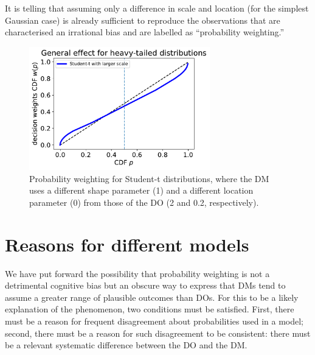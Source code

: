 \documentclass[a4paper, 12pt]{article}
\newcommand{\flabel}[1]{\label{fig:#1}}
\newcommand{\seclabel}[1]{\label{sec:#1}}
\newcommand{\ND}{\mathcal{N}} %
\begin{document}
It is telling that assuming only a difference in scale and location (for the simplest Gaussian case) is already sufficient to reproduce the observations that are characterised an irrational bias and are labelled as ``probability weighting.''

\begin{figure}[htb]
\centering
\includegraphics[width=0.7\textwidth]{./figs/Student-t.pdf}
\caption{Probability weighting for Student-t distributions, where the DM uses a different shape parameter (1) and a different location parameter (0) from those of the DO (2 and 0.2, respectively).}
\flabel{fat_tailed_CDF}
\end{figure}



\FloatBarrier
\section{Reasons for different models\seclabel{Reasons_for}}
We have put forward the possibility that probability weighting is not a detrimental cognitive bias but an obscure way to express that DMs tend to assume a greater range of plausible outcomes than DOs. For this to be a likely explanation of the phenomenon, two conditions must be satisfied. First, there must be a reason for frequent disagreement about probabilities used in a model; second, there must be a reason for such disagreement to be consistent: there must be a relevant systematic difference between the DO and the DM. 
\end{document}
